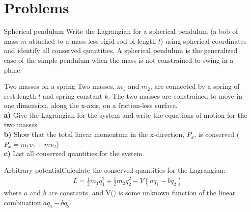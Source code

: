 %
\section{Problems}
\begin{problem}{Spherical pendulum} Write the Lagrangian for a spherical pendulum (a bob of mass $m$ attached to a mass-less rigid rod of length $l$) using spherical coordinates and identify all conserved quantities. A spherical pendulum is the generalized case of the simple pendulum when the mass is not constrained to swing in a plane. 
\label{prob_ConsSym_1}
\end{problem}

\begin{problem}{Two masses on a spring} Two masses, $m_1$ and $m_2$, are connected by a spring of rest length $l$ and spring constant $k$. The two masses are constrained to move in one dimension, along the x-axis, on a friction-less surface.\\
\textbf{a)} Give the Lagrangian for the system and write the equations of motion for the two masses\\
\textbf{b)} Show that the total linear momentum in the x-direction, $P_x$, is conserved ($P_x=m_1v_1+mv_2$)\\
\textbf{c)} List all conserved quantities for the system.
\label{prob_ConsSym_2}
\end{problem}

\begin{problem}{Arbitrary potential}Calculate the conserved quantities for the Lagrangian:
\begin{align*}
L=\frac{1}{2}m_1\dot{q}_1^2+\frac{1}{2}m_2\dot{q}_2^2-V(aq_1-bq_2)
\end{align*}
where $a$ and $b$ are constants, and V() is some unknown function of the linear combination $aq_1-bq_2$.
\label{prob_ConsSym_3}
\end{problem}

